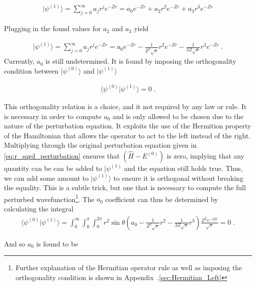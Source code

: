         \begin{align}
            \vert \psi^{(1)} \rangle = \sum_{j = 0}^\infty a_j r^j e^{-Zr} = a_0 e^{-Zr} + a_2 r^2 e^{-Zr} + a_3 r^3 e^{-Zr}
        \end{align}

        \noindent Plugging in the found values for $a_2$ and $a_3$ yield 

        \begin{align}
            \vert \psi^{(1)} \rangle = \sum_{j = 0}^\infty a_j r^j e^{-Zr} = a_0 e^{-Zr} - \frac{1}{Z^2 \sqrt{\pi}} r^2 e^{-Zr} - \frac{1}{3Z \sqrt{\pi}} r^3 e^{-Zr}\;.
        \end{align}
        Currently, $a_0$ is still undetermined. It is found by imposing the orthogonality condition between $\vert \psi^{(0)} \rangle$ and $\vert \psi^{(1)} \rangle$

        \begin{align}
            \langle \psi^{(0)} \vert \psi^{(1)} \rangle = 0\;.
        \end{align}

        This orthogonality relation is a choice, and it not required by any law or rule. It is necessary in order to compute $a_0$ and is only allowed to be chosen due to the nature of the perturbation equation. It exploits the use of the Hermition property of the Hamiltonian that allows the operator to act to the left instead of the right. Multiplying through the original perturbation equation given in \eqref{eq:r_sqrd_perturbation} ensures that $\left(\hat{H} - E^{(0)} \right)$ is zero, implying that any quantity can be can be added to $\vert \psi^{(1)}$ and the equation still holds true. Thus, we can add some amount to $\vert \psi^{(1)} \rangle$ to ensure it is orthogonal without breaking the equality. This is a subtle trick, but one that is necessary to compute the full perturbed wavefunction\footnote{Further explanation of the Hermitian operator rule as well as imposing the orthogonality condition is shown in Appendix~.\ref{sec:Hermitian_Left}}. The $a_0$ coefficient can thus be determined by calculating the integral 
        \begin{align}
            \langle \psi^{(0)} \vert \psi^{(1)} \rangle = \int_0^\infty \int_0^\pi \int_0^{2\pi} r^2 \sin \theta \left(a_0 - \frac{1}{Z^2 \sqrt{\pi}} r^2 - \frac{1}{3Z \sqrt{\pi}} r^3 \right) \frac{Z^{\frac{3}{2}} e^{-2Zr}}{\sqrt{\pi}} = 0\;.
        \end{align}

        \noindent And so $a_0$ is found to be 


